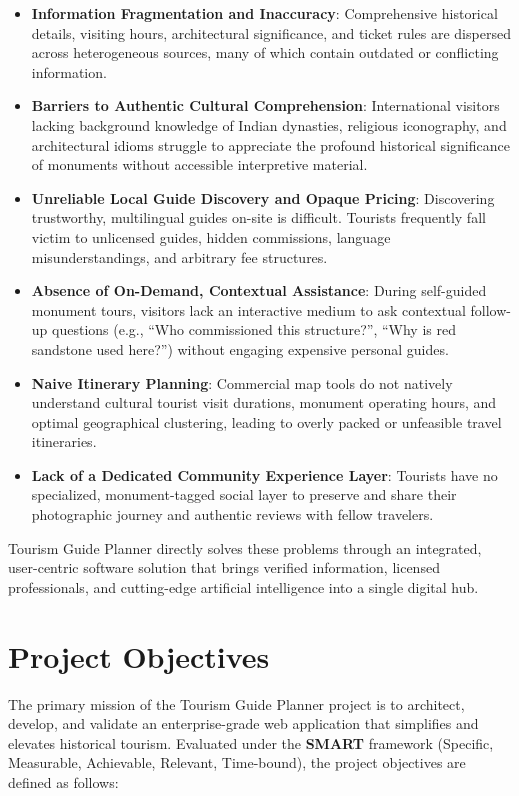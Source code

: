 \documentclass[12pt,a4paper,twoside,openright]{report}
\begin{document}
\begin{itemize}[leftmargin=*]
    \item \textbf{Information Fragmentation and Inaccuracy}: Comprehensive historical details, visiting hours, architectural significance, and ticket rules are dispersed across heterogeneous sources, many of which contain outdated or conflicting information.
    \item \textbf{Barriers to Authentic Cultural Comprehension}: International visitors lacking background knowledge of Indian dynasties, religious iconography, and architectural idioms struggle to appreciate the profound historical significance of monuments without accessible interpretive material.
    \item \textbf{Unreliable Local Guide Discovery and Opaque Pricing}: Discovering trustworthy, multilingual guides on-site is difficult. Tourists frequently fall victim to unlicensed guides, hidden commissions, language misunderstandings, and arbitrary fee structures.
    \item \textbf{Absence of On-Demand, Contextual Assistance}: During self-guided monument tours, visitors lack an interactive medium to ask contextual follow-up questions (e.g., ``Who commissioned this structure?'', ``Why is red sandstone used here?'') without engaging expensive personal guides.
    \item \textbf{Naive Itinerary Planning}: Commercial map tools do not natively understand cultural tourist visit durations, monument operating hours, and optimal geographical clustering, leading to overly packed or unfeasible travel itineraries.
    \item \textbf{Lack of a Dedicated Community Experience Layer}: Tourists have no specialized, monument-tagged social layer to preserve and share their photographic journey and authentic reviews with fellow travelers.
\end{itemize}

Tourism Guide Planner directly solves these problems through an integrated, user-centric software solution that brings verified information, licensed professionals, and cutting-edge artificial intelligence into a single digital hub.

\section{Project Objectives}

The primary mission of the Tourism Guide Planner project is to architect, develop, and validate an enterprise-grade web application that simplifies and elevates historical tourism. Evaluated under the \textbf{SMART} framework (Specific, Measurable, Achievable, Relevant, Time-bound), the project objectives are defined as follows:
\end{document}
